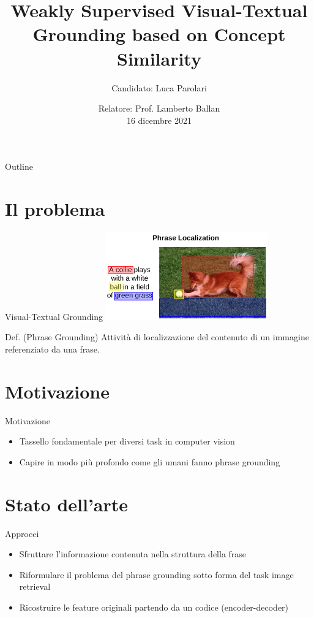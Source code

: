 \documentclass{beamer}
\title{Weakly Supervised Visual-Textual Grounding based on Concept Similarity}
\author{Candidato: Luca Parolari}
\date{Relatore: Prof. Lamberto Ballan \\ \vspace{0.2cm} \small 16 dicembre 2021}
\begin{document}
\maketitle

\begin{frame}{Outline}
  \tableofcontents
\end{frame}

\section{Il problema}

\begin{frame}{Visual-Textual Grounding}
  \centering
  \includegraphics[width=7cm]{images/dog-playing-with-ball.png}

  \vspace{0.5cm}

  \begin{alertblock}{Def. (Phrase Grounding)}
    Attività di localizzazione del contenuto di un immagine referenziato da una
    frase.
  \end{alertblock}
\end{frame}

\section{Motivazione}

\begin{frame}{Motivazione}
  \begin{itemize}
    \item Tassello fondamentale per diversi task in computer vision
    \item Capire in modo più profondo come gli umani fanno phrase grounding
  \end{itemize}
\end{frame}

\section{Stato dell'arte}

\begin{frame}{Approcci}
  \begin{itemize}
    \item Sfruttare l'informazione contenuta nella \alert{struttura
    della frase}
    \item Riformulare il problema del phrase grounding sotto forma del
    task \alert{image retrieval}
    \item \alert{Ricostruire} le feature originali partendo da un
    codice (encoder-decoder)
  \end{itemize}
\end{frame}
\end{document}
